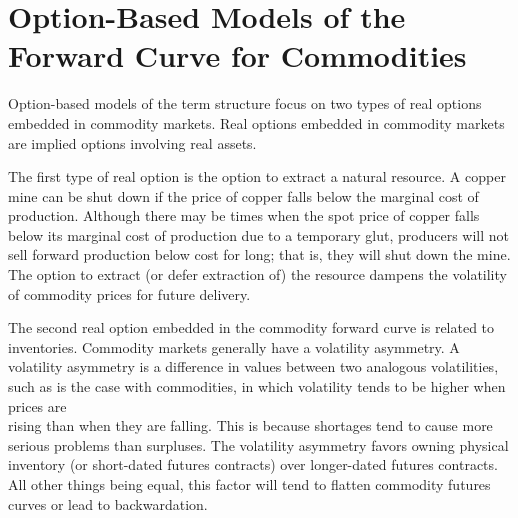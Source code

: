 \documentclass[11pt]{article}
\begin{document}
\section*{Option-Based Models of the Forward Curve for Commodities}
Option-based models of the term structure focus on two types of real options embedded in commodity markets. Real options embedded in commodity markets are implied options involving real assets.

The first type of real option is the option to extract a natural resource. A copper mine can be shut down if the price of copper falls below the marginal cost of production. Although there may be times when the spot price of copper falls below its marginal cost of production due to a temporary glut, producers will not sell forward production below cost for long; that is, they will shut down the mine. The option to extract (or defer extraction of) the resource dampens the volatility of commodity prices for future delivery.

The second real option embedded in the commodity forward curve is related to inventories. Commodity markets generally have a volatility asymmetry. A volatility asymmetry is a difference in values between two analogous volatilities, such as is the case with commodities, in which volatility tends to be higher when prices are\\
rising than when they are falling. This is because shortages tend to cause more serious problems than surpluses. The volatility asymmetry favors owning physical inventory (or short-dated futures contracts) over longer-dated futures contracts. All other things being equal, this factor will tend to flatten commodity futures curves or lead to backwardation.
\end{document}
